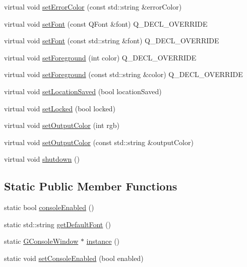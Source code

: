 \begin{DoxyCompactItemize}
\item 
virtual void \mbox{\hyperlink{classGConsoleWindow_a861f9b53c09ae13bb80117c0d44f3975}{set\+Error\+Color}} (const std\+::string \&error\+Color)
\item 
virtual void \mbox{\hyperlink{classGConsoleWindow_a2d22014c7fa3bccfd58c982aea1b55fa}{set\+Font}} (const Q\+Font \&font) Q\+\_\+\+D\+E\+C\+L\+\_\+\+O\+V\+E\+R\+R\+I\+DE
\item 
virtual void \mbox{\hyperlink{classGConsoleWindow_ab39ef411fb13a52852ddd138c5932e2e}{set\+Font}} (const std\+::string \&font) Q\+\_\+\+D\+E\+C\+L\+\_\+\+O\+V\+E\+R\+R\+I\+DE
\item 
virtual void \mbox{\hyperlink{classGConsoleWindow_aec0cb4bd54617629ad4790101f4a3486}{set\+Foreground}} (int color) Q\+\_\+\+D\+E\+C\+L\+\_\+\+O\+V\+E\+R\+R\+I\+DE
\item 
virtual void \mbox{\hyperlink{classGConsoleWindow_a088e04dfc56273df4cedab2b11b970f5}{set\+Foreground}} (const std\+::string \&color) Q\+\_\+\+D\+E\+C\+L\+\_\+\+O\+V\+E\+R\+R\+I\+DE
\item 
virtual void \mbox{\hyperlink{classGConsoleWindow_a09e1b8e5702b3e4fb3d508fb8d0d7eb8}{set\+Location\+Saved}} (bool location\+Saved)
\item 
virtual void \mbox{\hyperlink{classGConsoleWindow_a1d054ba8ac31a4bee0e981be35215693}{set\+Locked}} (bool locked)
\item 
virtual void \mbox{\hyperlink{classGConsoleWindow_a1e68d0d1dfd3b4036e881aac7be782dd}{set\+Output\+Color}} (int rgb)
\item 
virtual void \mbox{\hyperlink{classGConsoleWindow_a0e00b599c341223e6c13a92a686fc9ce}{set\+Output\+Color}} (const std\+::string \&output\+Color)
\item 
virtual void \mbox{\hyperlink{classGConsoleWindow_a7861ee1569802186a619778efc85af13}{shutdown}} ()
\end{DoxyCompactItemize}
\subsection*{Static Public Member Functions}
\begin{DoxyCompactItemize}
\item 
static bool \mbox{\hyperlink{classGConsoleWindow_a79d010502f6335a26522afc7af6227b1}{console\+Enabled}} ()
\item 
static std\+::string \mbox{\hyperlink{classGConsoleWindow_a024cf8344538499b9546e923717459cd}{get\+Default\+Font}} ()
\item 
static \mbox{\hyperlink{classGConsoleWindow}{G\+Console\+Window}} $\ast$ \mbox{\hyperlink{classGConsoleWindow_ae0a74cd46dda62142582f3d8d512f4e5}{instance}} ()
\item 
static void \mbox{\hyperlink{classGConsoleWindow_a452f7778aaba21498765444f907bb0a0}{set\+Console\+Enabled}} (bool enabled)
\end{DoxyCompactItemize}
